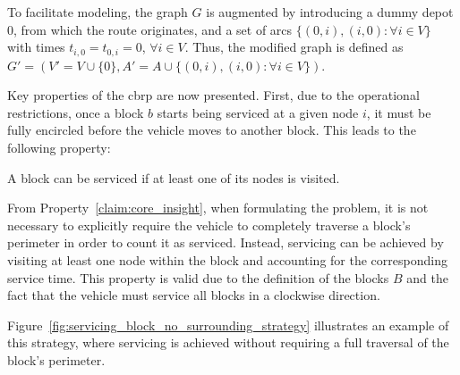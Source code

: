 To facilitate modeling, the graph $G$ is augmented by introducing a dummy depot
$0$, from which the route originates, and a set of arcs $\{(0, i), (i, 0) :
	\forall i \in V\}$ with times $t_{i,0} = t_{0,i} = 0$, $\forall i \in V$. Thus,
the modified graph is defined as $G' = (V' = V \cup \{0\}, A' = A \cup \{(0, i),
	(i, 0) : \forall i \in V\})$.

Key properties of the \gls{cbrp} are now presented. First, due to the operational
restrictions, once a block $b$ starts being serviced at a given node $i$, it
must be fully encircled before the vehicle moves to another block. This leads to
the following property:

\begin{property}
	\label{claim:core_insight}
	A block can be serviced if at least one of its nodes is visited.
\end{property}

From Property~\ref{claim:core_insight}, when formulating the problem, it is not
necessary to explicitly require the vehicle to completely traverse a block's
perimeter in order to count it as serviced. Instead, servicing can be achieved
by visiting at least one node within the block and accounting for the
corresponding service time. This property is valid due to the definition of the
blocks $B$ and the fact that the vehicle must service all blocks in a clockwise
direction.

Figure~\ref{fig:servicing_block_no_surrounding_strategy} illustrates an example
of this strategy, where servicing is achieved without requiring a full traversal
of the block's perimeter.

